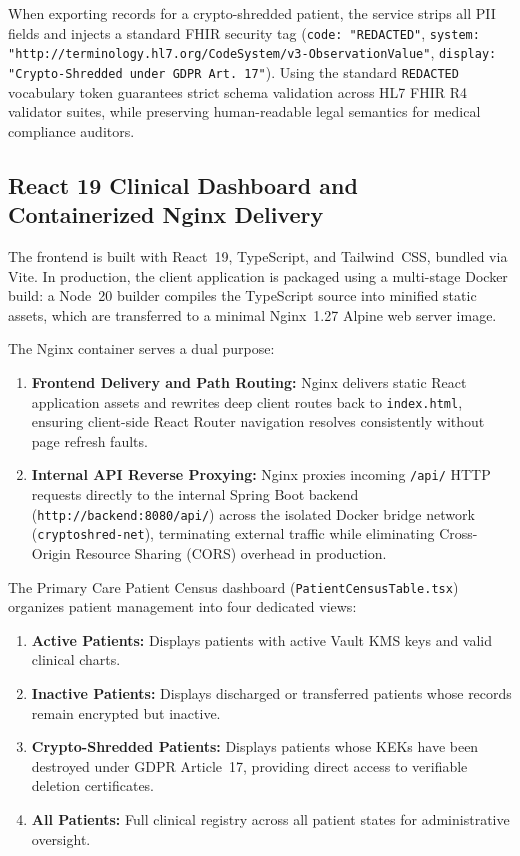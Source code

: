 When exporting records for a crypto-shredded patient, the service strips all PII fields and injects a standard FHIR security tag (\texttt{code: "REDACTED"}, \texttt{system: "http://terminology.hl7.org/CodeSystem/v3-ObservationValue"}, \texttt{display: "Crypto-Shredded under GDPR Art. 17"}). Using the standard \texttt{REDACTED} vocabulary token guarantees strict schema validation across HL7 FHIR R4 validator suites, while preserving human-readable legal semantics for medical compliance auditors.

\subsection{React 19 Clinical Dashboard and Containerized Nginx Delivery}

The frontend is built with React~19, TypeScript, and Tailwind~CSS, bundled via Vite. In production, the client application is packaged using a multi-stage Docker build: a Node~20 builder compiles the TypeScript source into minified static assets, which are transferred to a minimal Nginx~1.27 Alpine web server image.

The Nginx container serves a dual purpose:
\begin{enumerate}
    \item \textbf{Frontend Delivery and Path Routing:} Nginx delivers static React application assets and rewrites deep client routes back to \texttt{index.html}, ensuring client-side React Router navigation resolves consistently without page refresh faults.
    \item \textbf{Internal API Reverse Proxying:} Nginx proxies incoming \texttt{/api/} HTTP requests directly to the internal Spring Boot backend (\texttt{http://backend:8080/api/}) across the isolated Docker bridge network (\texttt{cryptoshred-net}), terminating external traffic while eliminating Cross-Origin Resource Sharing (CORS) overhead in production.
\end{enumerate}

The Primary Care Patient Census dashboard (\texttt{PatientCensusTable.tsx}) organizes patient management into four dedicated views:
\begin{enumerate}
    \item \textbf{Active Patients:} Displays patients with active Vault KMS keys and valid clinical charts.
    \item \textbf{Inactive Patients:} Displays discharged or transferred patients whose records remain encrypted but inactive.
    \item \textbf{Crypto-Shredded Patients:} Displays patients whose KEKs have been destroyed under GDPR Article~17, providing direct access to verifiable deletion certificates.
    \item \textbf{All Patients:} Full clinical registry across all patient states for administrative oversight.
\end{enumerate}

